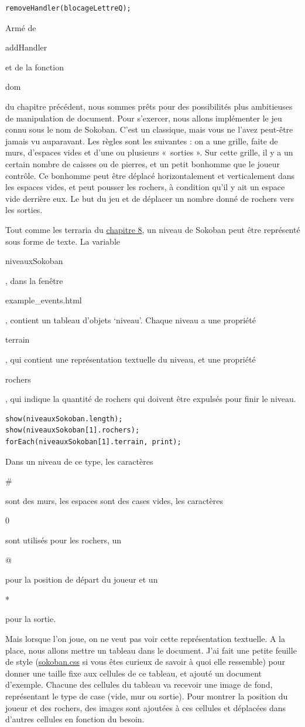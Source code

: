 \documentclass{FramateX}
\renewcommand{\texttt}[1]{\begin{sffamily}{#1}\end{sffamily}}
\begin{document}
\begin{lstlisting}
removeHandler(blocageLettreQ);
\end{lstlisting}
\begin{center}\end{center}

Armé de \texttt{addHandler} et de la fonction \texttt{dom} du chapitre
précédent, nous sommes prêts pour des possibilités plus ambitieuses de
manipulation de document. Pour s'exercer, nous allons implémenter le jeu
connu sous le nom de Sokoban. C'est un classique, mais vous ne l'avez
peut-être jamais vu auparavant. Les règles sont les suivantes : on a une
grille, faite de murs, d'espaces vides et d'une ou plusieurs «~sorties
». Sur cette grille, il y a un certain nombre de caisses ou de pierres,
et un petit bonhomme que le joueur contrôle. Ce bonhomme peut être
déplacé horizontalement et verticalement dans les espaces vides, et peut
pousser les rochers, à condition qu'il y ait un espace vide derrière
eux. Le but du jeu et de déplacer un nombre donné de rochers vers les
sorties.

Tout comme les terraria du \href{chapter8.html}{chapitre 8}, un niveau
de Sokoban peut être représenté sous forme de texte. La variable
\texttt{niveauxSokoban}, dans la fenêtre \texttt{example\_events.html},
contient un tableau d'objets `niveau'. Chaque niveau a une propriété
\texttt{terrain}, qui contient une représentation textuelle du niveau,
et une propriété \texttt{rochers}, qui indique la quantité de rochers
qui doivent être expulsés pour finir le niveau.

\begin{lstlisting}
show(niveauxSokoban.length);
show(niveauxSokoban[1].rochers);
forEach(niveauxSokoban[1].terrain, print);
\end{lstlisting}
Dans un niveau de ce type, les caractères \texttt{\#} sont des murs, les
espaces sont des cases vides, les caractères \texttt{0} sont utilisés
pour les rochers, un \texttt{@} pour la position de départ du joueur et
un \texttt{*} pour la sortie.

\begin{center}\end{center}

Mais lorsque l'on joue, on ne veut pas voir cette représentation
textuelle. A la place, nous allons mettre un tableau dans le document.
J'ai fait une petite feuille de style
(\href{css/sokoban.css}{sokoban.css} si vous êtes curieux de savoir à
quoi elle ressemble) pour donner une taille fixe aux cellules de ce
tableau, et ajouté un document d'exemple. Chacune des cellules du
tableau va recevoir une image de fond, représentant le type de case
(vide, mur ou sortie). Pour montrer la position du joueur et des
rochers, des images sont ajoutées à ces cellules et déplacées dans
d'autres cellules en fonction du besoin.
\end{document}
